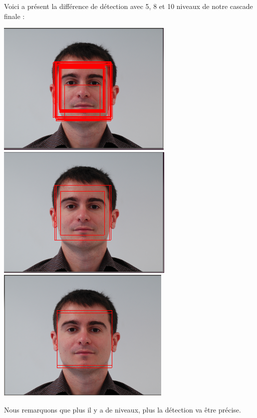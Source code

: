 \documentclass[12pt,a4paper]{article}
\begin{document}
\newpage
Voici a présent la différence de détection avec 5, 8 et 10 niveaux de notre cascade finale :
\begin{center}
\vspace{0.8cm}
\includegraphics[scale=0.5]{Pictures/frontal_5layers.png}
\vspace{0.8cm}
\includegraphics[scale=0.5]{Pictures/frontal_8layers.png}
\vspace{0.8cm}
\includegraphics[scale=0.5]{Pictures/frontal_10layers.png}
\end{center}

Nous remarquons que plus il y a de niveaux, plus la détection va être précise.

\newpage
\end{document}
